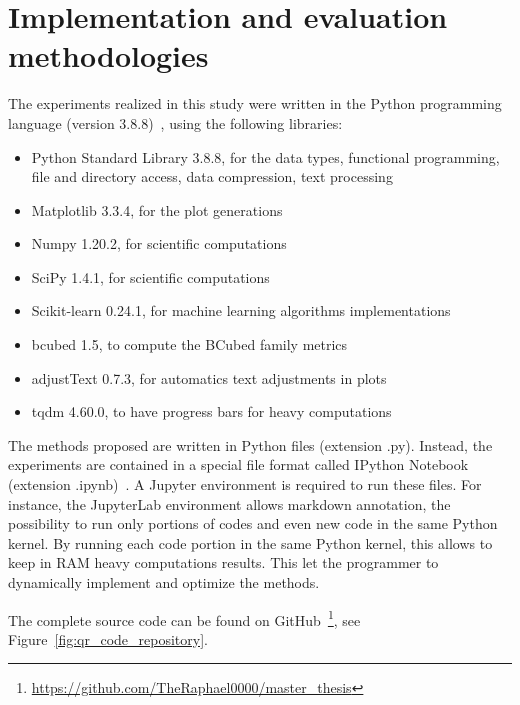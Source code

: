 \section{Implementation and evaluation methodologies}

The experiments realized in this study were written in the Python programming language (version 3.8.8)~\cite{python}, using the following libraries:

\begin{itemize}
  \item Python Standard Library 3.8.8, for the data types, functional programming, file and directory access, data compression, text processing~\cite{python_standard_library}
  \item Matplotlib 3.3.4, for the plot generations~\cite{matplotlib}
  \item Numpy 1.20.2, for scientific computations~\cite{numpy}
  \item SciPy 1.4.1, for scientific computations~\cite{scipy}
  \item Scikit-learn 0.24.1, for machine learning algorithms implementations~\cite{sklearn}
  \item bcubed 1.5, to compute the BCubed family metrics~\cite{bcubed_gh}
  \item adjustText 0.7.3, for automatics text adjustments in plots~\cite{adjustText}
  \item tqdm 4.60.0, to have progress bars for heavy computations~\cite{tqdm}
\end{itemize}

The methods proposed are written in Python files (extension .py).
Instead, the experiments are contained in a special file format called IPython Notebook (extension .ipynb)~\cite{jupyter}.
A Jupyter environment is required to run these files.
For instance, the JupyterLab environment allows markdown annotation, the possibility to run only portions of codes and even new code in the same Python kernel.
By running each code portion in the same Python kernel, this allows to keep in RAM heavy computations results.
This let the programmer to dynamically implement and optimize the methods.

The complete source code can be found on GitHub~\footnote{\url{https://github.com/TheRaphael0000/master_thesis}}, see Figure~\ref{fig:qr_code_repository}.

